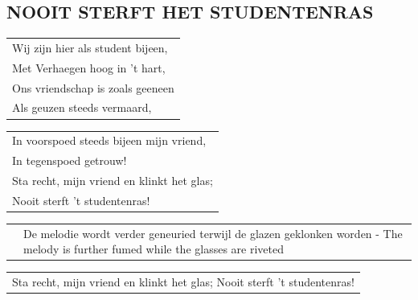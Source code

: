\documentclass[a4paper, 14pt]{extarticle}
\begin{document}
\subsection*{NOOIT STERFT HET STUDENTENRAS}
\begin{flushleft}
\begin{tabularx}{0.8\textwidth} {
   >{\raggedright\arraybackslash}X}
   Wij zijn hier als student bijeen,\\
Met Verhaegen hoog in ’t hart,\\
Ons vriendschap is zoals geeneen\\
Als geuzen steeds vermaard,\\
\end{tabularx}
\end{flushleft}\begin{flushleft}
\begin{tabularx}{0.8\textwidth} {
   >{\raggedright\arraybackslash}X}
In voorspoed steeds bijeen mijn vriend,\\
In tegenspoed getrouw!\\
Sta recht, mijn vriend en klinkt het glas;\\
Nooit sterft ’t studentenras!\\
\end{tabularx}
\end{flushleft}\begin{flushleft}
\begin{tabularx}{0.8\textwidth} {
   c >{\raggedright\arraybackslash}X}
\hspace{5mm} & {\small De melodie wordt verder geneuried terwijl de glazen geklonken worden - The melody is further fumed while the glasses are riveted}\\
\end{tabularx}
\end{flushleft}\begin{flushleft}
\begin{tabularx}{0.8\textwidth} {
   >{\raggedright\arraybackslash}X}Sta recht, mijn vriend en klinkt het glas;
Nooit sterft ’t studentenras!\\
\end{tabularx}
\end{flushleft}
\end{document}
